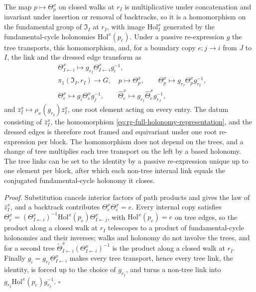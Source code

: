 The map $p\mapsto\Theta^x_p$ on closed walks at $r_I$ is multiplicative under concatenation and invariant
under insertion or removal of backtracks, so it is a homomorphism on the fundamental group of
$\mathfrak I_I$ at $r_I$, with image $\mathrm{Hol}^x_I$ generated by the fundamental-cycle holonomies
$\mathrm{Hol}^x(p_e)$. Under a passive re-expression $g$ the tree transports, this homomorphism, and, for a
boundary copy $e:j\to i$ from $J$ to $I$, the link and the dressed edge transform as
\begin{align}
&\Theta^x_{I\leftarrow i}\longmapsto g_{r_I}\Theta^x_{I\leftarrow i}g_i^{-1},
\label{eq:rg-tree-transport-law}\\
&\pi_1(\mathfrak I_I,r_I)\longrightarrow G,\quad p\longmapsto\Theta^x_p,
\qquad
\Theta^x_p\longmapsto g_{r_I}\Theta^x_pg_{r_I}^{-1},
\label{eq:rg-full-holonomy-representation}\\
&\Theta^x_e\longmapsto g_i\Theta^x_eg_j^{-1},
\qquad
\widehat\Theta^x_e\longmapsto g_{r_I}\widehat\Theta^x_eg_{r_J}^{-1},
\label{eq:rg-dressed-boundary-edge}
\end{align}
and $\bar z^x_I\mapsto\rho_x(g_{r_I})\bar z^x_I$, one root element acting on every entry. The datum
consisting of $\bar z^x_I$, the homomorphism \eqref{eq:rg-full-holonomy-representation}, and the dressed
edges is therefore root framed and equivariant under one root re-expression per block. The homomorphism
does not depend on the trees, and a change of tree multiplies each tree transport on the left by a based
holonomy. The tree links can be set to the identity by a passive re-expression unique up to one element
per block, after which each non-tree internal link equals the conjugated fundamental-cycle holonomy it
closes. 

\noindent\emph{Proof.}
Substitution cancels interior factors of path products and gives the law of $\bar z^x_I$, and a backtrack
contributes $\Theta^x_e\Theta^x_{\bar e}=e$. Every internal copy satisfies
$\Theta^x_e=(\Theta^x_{I\leftarrow i})^{-1}\mathrm{Hol}^x(p_e)\Theta^x_{I\leftarrow j}$, with $\mathrm{Hol}^x(p_e)=e$
on tree edges, so the product along a closed walk at $r_I$ telescopes to a product of fundamental-cycle
holonomies and their inverses; walks and holonomy do not involve the trees, and for a second tree
$\widetilde\Theta^x_{I\leftarrow i}(\Theta^x_{I\leftarrow i})^{-1}$ is the product along a closed walk at
$r_I$. Finally $g_i=g_{r_I}\Theta^x_{I\leftarrow i}$ makes every tree transport, hence every tree link, the
identity, is forced up to the choice of $g_{r_I}$, and turns a non-tree link into
$g_{r_I}\mathrm{Hol}^x(p_e)g_{r_I}^{-1}$. $\square$

